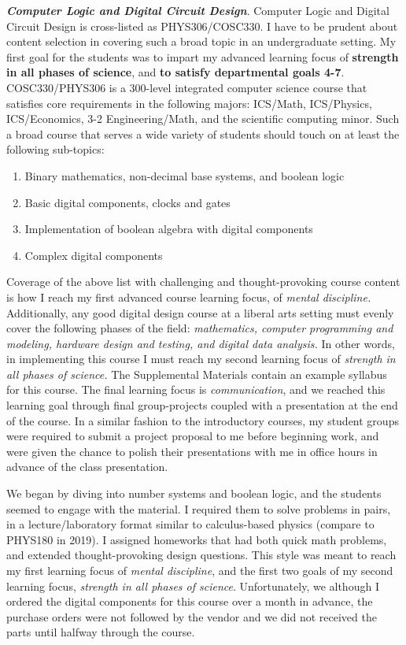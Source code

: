 \documentclass[../../../main.tex]{subfiles}
\begin{document}
\textbf{\textit{Computer Logic and Digital Circuit Design}}. Computer Logic and Digital Circuit Design is cross-listed as PHYS306/COSC330.  I have to be prudent about content selection in covering such a broad topic in an undergraduate setting. My first goal for the students was to impart my advanced learning focus of \textbf{strength in all phases of science}, and \textbf{to satisfy departmental goals 4-7}.  COSC330/PHYS306 is a 300-level integrated computer science course that satisfies core requirements in the following majors: ICS/Math, ICS/Physics, ICS/Economics, 3-2 Engineering/Math, and the scientific computing minor.  Such a broad course that serves a wide variety of students should touch on at least the following sub-topics:

\begin{enumerate}
\item Binary mathematics, non-decimal base systems, and boolean logic
\item Basic digital components, clocks and gates
\item Implementation of boolean algebra with digital components
\item Complex digital components
\end{enumerate}

Coverage of the above list with challenging and thought-provoking course content is how I reach my first advanced course learning focus, of \textit{mental discipline.}  Additionally, any good digital design course at a liberal arts setting must evenly cover the following phases of the field: \textit{mathematics, computer programming and modeling, hardware design and testing, and digital data analysis.}  In other words, in implementing this course I must reach my second learning focus of \textit{strength in all phases of science.}  The Supplemental Materials contain an example syllabus for this course.  The final learning focus is \textit{communication}, and we reached this learning goal through final group-projects coupled with a presentation at the end of the course.  In a similar fashion to the introductory courses, my student groups were required to submit a project proposal to me before beginning work, and were given the chance to polish their presentations with me in office hours in advance of the class presentation. \\ \hspace{0.1cm}

We began by diving into number systems and boolean logic, and the students seemed to engage with the material.  I required them to solve problems in pairs, in a lecture/laboratory format similar to calculus-based physics (compare to PHYS180 in 2019).  I assigned homeworks that had both quick math problems, and extended thought-provoking design questions.  This style was meant to reach my first learning focus of \textit{mental discipline}, and the first two goals of my second learning focus, \textit{strength in all phases of science}.  Unfortunately, we although I ordered the digital components for this course over a month in advance, the purchase orders were not followed by the vendor and we did not received the parts until halfway through the course.  \\ \hspace{0.1cm} 
\end{document}

